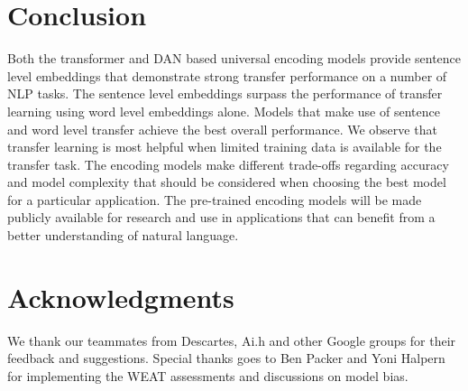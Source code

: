 \documentclass[11pt,a4paper]{article}
\begin{document}
\section{Conclusion}

Both the transformer and DAN based universal encoding models provide sentence level embeddings that demonstrate strong transfer performance on a number of NLP tasks. The sentence level embeddings surpass the performance of transfer learning using word level embeddings alone. Models that make use of sentence and word level transfer achieve the best overall performance. We observe that transfer learning is most helpful when limited training data is available for the transfer task. The encoding models make different trade-offs regarding accuracy and model complexity that should be considered when choosing the best model for a particular application. The pre-trained encoding models will be made publicly available for research and use in applications that can benefit from a better understanding of natural language.

\section*{Acknowledgments}

We thank our teammates from Descartes, Ai.h and other Google groups for their feedback and suggestions. Special thanks goes to Ben Packer and Yoni Halpern for implementing the WEAT assessments and discussions on model bias.





\appendix
\end{document}
